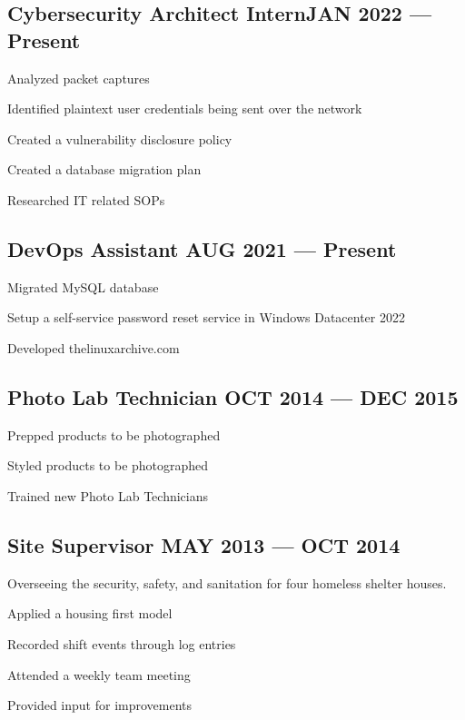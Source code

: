 \documentclass[letter,10pt]{article}
\begin{document}
\subsection{{Cybersecurity Architect Intern\hfill JAN 2022 --- Present}}
\begin{zitemize}
\item Analyzed packet captures
\item Identified plaintext user credentials being sent over the network
\item Created a vulnerability disclosure policy
\item Created a database migration plan
\item Researched IT related SOPs
\end{zitemize}

\subsection{{DevOps Assistant \hfill AUG 2021 --- Present}}
\begin{zitemize}
\item Migrated MySQL database
\item Setup a self-service password reset service in Windows Datacenter 2022
\item Developed thelinuxarchive.com
\end{zitemize}

\subsection{{Photo Lab Technician \hfill OCT 2014 --- DEC 2015}}
\begin{zitemize}
\item Prepped products to be photographed
\item Styled products to be photographed
\item Trained new Photo Lab Technicians
\end{zitemize}

\subsection{{Site Supervisor \hfill MAY 2013 --- OCT 2014}}
\begin{zitemize}
\item Overseeing the security, safety, and sanitation for four homeless shelter houses.
\item Applied a housing first model
\item Recorded shift events through log entries
\item Attended a weekly team meeting
\item Provided input for improvements
\end{zitemize}
\end{document}
